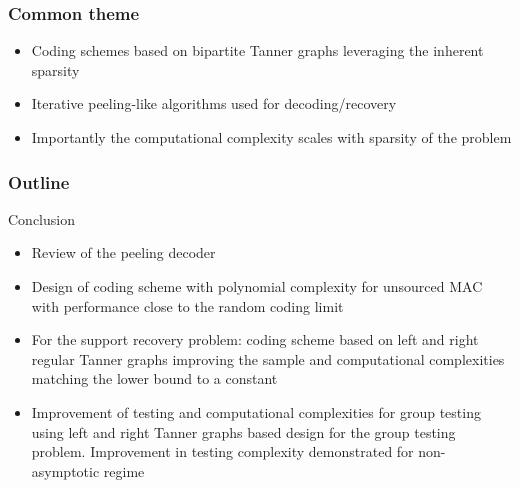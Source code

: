 \documentclass[10pt,usenames,dvipsnames]{beamer}
\def\figpath{../Figures}
\begin{document}
\begin{frame} 
\frametitle{Common theme}
\begin{itemize}
	\setlength{\itemsep}{4pt}
	\item Coding schemes based on {\color{blue}bipartite Tanner graphs} leveraging the inherent sparsity
	\item<2-> {\color{blue} Iterative peeling}-like algorithms used for decoding/recovery 
	\item<2-> Importantly the {\color{blue} computational complexity scales with sparsity} of the problem
\end{itemize}
\centering
\resizebox{0.5\textwidth}{!}{}
\end{frame}

\begin{frame}
	\frametitle{Outline}
	\tableofcontents
\end{frame}








\begin{frame}{Conclusion}
\begin{itemize} 
  \item Review of the peeling decoder
  \item Design of coding scheme with polynomial complexity for unsourced MAC with performance close to the random coding limit
  \item For the support recovery problem: coding scheme based on left and right regular Tanner graphs improving the sample and computational complexities matching the lower bound to a constant
    \item Improvement of testing and computational complexities for group testing using left and right Tanner graphs based design for the group testing problem. Improvement in testing complexity demonstrated for non-asymptotic regime
\end{itemize}
\end{frame}
\end{document}

